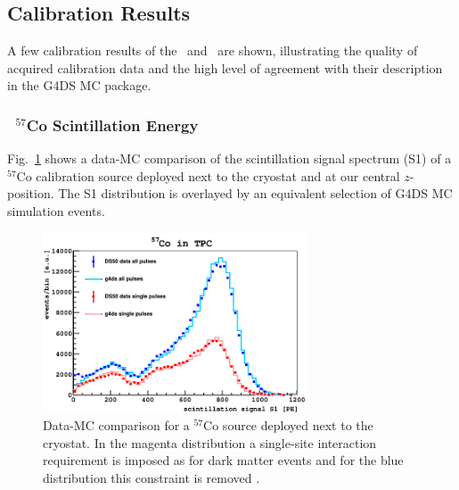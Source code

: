 

\subsection{Calibration Results}
A few calibration results of the \tpc\ and \lsv\ are shown, illustrating the quality of acquired calibration data and the high level of agreement with their description in the G4DS MC package.

\subsubsection{\tpc\ $^{57}$Co Scintillation Energy}
Fig.~\ref{fig:CalibData:Co57} shows a data-MC comparison of the scintillation signal spectrum (S1) of a $^{57}$Co calibration source deployed next to the cryostat and at our central $z$-position. The S1 distribution is overlayed by an equivalent selection of G4DS MC simulation events.

\begin{figure}[htbp]
\centering
\includegraphics[width=0.7\textwidth]{./Figures/Co57_TPC.png}
\caption{Data-MC comparison for a $^{57}$Co source deployed next to the cryostat. In the magenta distribution a single-site interaction requirement is imposed as for dark matter events and for the blue distribution this constraint is removed \cite{DS50:G4DS:paper}.
\label{fig:CalibData:Co57}}
 \end{figure}

